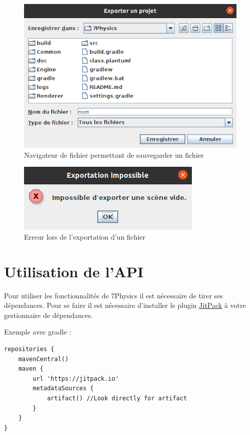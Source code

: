 \documentclass[11pt]{report}
\begin{document}
\begin{figure}[h]
  \centering
  \includegraphics[scale=0.83]{./nav_fichier_exp.png}
  \caption{Navigateur de fichier permettant de sauvegarder un fichier}
\end{figure}

\begin{figure}[h]
  \centering
  \includegraphics{./error_exp.png}
  \caption{Erreur lors de l'exportation d'un fichier}
\end{figure}

\chapter{Utilisation de l'API}

Pour utiliser les fonctionnalités de 7Physics il est nécessaire de tirer ses dépendances. Pour se faire il est nécessaire d'installer le plugin \href{https://jitpack.io/}{\color{blue}JitPack} à votre gestionnaire de dépendances.

Exemple avec gradle :

\begin{verbatim}
repositories {
    mavenCentral()
    maven {
        url 'https://jitpack.io'
        metadataSources {
            artifact() //Look directly for artifact
        }
    }
}
\end{verbatim}
\end{document}
